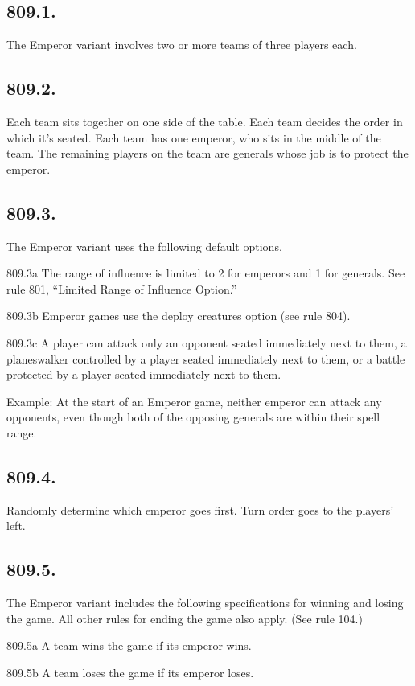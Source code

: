 \subsection*{809.1.}
The Emperor variant involves two or more teams of three players each.

\subsection*{809.2.}
Each team sits together on one side of the table. Each team decides the order in which it’s seated. Each team has one emperor, who sits in the middle of the team. The remaining players on the team are generals whose job is to protect the emperor.

\subsection*{809.3.}
The Emperor variant uses the following default options.

809.3a The range of influence is limited to 2 for emperors and 1 for generals. See rule 801, “Limited Range of Influence Option.”

809.3b Emperor games use the deploy creatures option (see rule 804).

809.3c A player can attack only an opponent seated immediately next to them, a planeswalker controlled by a player seated immediately next to them, or a battle protected by a player seated immediately next to them.

Example: At the start of an Emperor game, neither emperor can attack any opponents, even though both of the opposing generals are within their spell range.

\subsection*{809.4.}
Randomly determine which emperor goes first. Turn order goes to the players’ left.

\subsection*{809.5.}
The Emperor variant includes the following specifications for winning and losing the game. All other rules for ending the game also apply. (See rule 104.)

809.5a A team wins the game if its emperor wins.

809.5b A team loses the game if its emperor loses.

